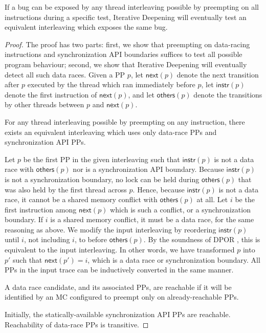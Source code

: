 \newcommand\ppnext[1]{\ensuremath{\mathsf{next}(#1)}}
\newcommand\ppinstr[1]{\ensuremath{\mathsf{instr}(#1)}}
\newcommand\ppothers[1]{\ensuremath{\mathsf{others}(#1)}}
\begin{theorem}[Convergence]
If a bug can be exposed by any thread interleaving possible by preempting on all instructions during a specific test,
Iterative Deepening will eventually test an equivalent interleaving which exposes the same bug.
\end{theorem}
\begin{proof}
The proof has two parts:
first, we show that preempting on data-racing instructions and synchronization API boundaries suffices to test all possible program behaviour;
second, we show that Iterative Deepening will eventually detect all such data races.
Given a PP $p$, let $\ppnext{p}$ denote the next transition after $p$ executed by the thread which ran immediately before $p$,
let $\ppinstr{p}$ denote the first instruction of $\ppnext{p}$,
and let $\ppothers{p}$ denote the transitions by other threads between $p$ and $\ppnext{p}$.

\begin{lemma}
For any thread interleaving possible by preempting on any instruction,
there exists an equivalent interleaving which uses only data-race PPs and synchronization API PPs.
	\label{lem:relevant}
\end{lemma}

Let $p$ be the first PP in the given interleaving such that $\ppinstr{p}$ is not a data race with $\ppothers{p}$ nor is a synchronization API boundary.
Because $\ppinstr{p}$ is not a synchronization boundary,
no lock can be held during $\ppothers{p}$ that was also held by the first thread across $p$.
Hence, because $\ppinstr{p}$ is not a data race, it cannot be a shared memory conflict with $\ppothers{p}$ at all.
Let $i$ be the first instruction among $\ppnext{p}$ which is such a conflict, or a synchronization boundary.
If $i$ is a shared memory conflict, it must be a data race, for the same reasoning as above.
We modify the input interleaving by reordering $\ppinstr{p}$ until $i$, not including $i$, to before $\ppothers{p}$.
By the soundness of DPOR \cite{dpor}, this is equivalent to the input interleaving.
In other words, we have transformed $p$ into $p'$ such that $\ppnext{p'} = i$, which is a data race or synchronization boundary.
All PPs in the input trace can be inductively converted in the same manner.

\begin{definition}[Reachability]
A data race candidate, and its associated PPs, are reachable if it will be identified by an MC configured to preempt only on already-reachable PPs.
\end{definition}
Initially, the statically-available synchronization API PPs are reachable. Reachability of data-race PPs is transitive.


\end{proof}
